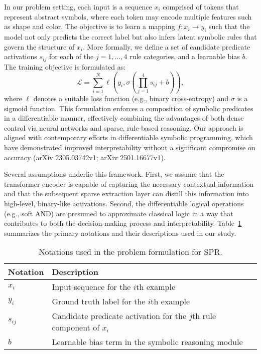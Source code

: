 \documentclass{article}
\begin{document}
In our problem setting, each input is a sequence \( x_i \) comprised of tokens that represent abstract symbols, where each token may encode multiple features such as shape and color. The objective is to learn a mapping \( f: x_i \rightarrow y_i \) such that the model not only predicts the correct label but also infers latent symbolic rules that govern the structure of \( x_i \). More formally, we define a set of candidate predicate activations \( s_{ij} \) for each of the \( j=1,\dots,4 \) rule categories, and a learnable bias \( b \). The training objective is formulated as:
\[
\mathcal{L} = \sum_{i=1}^{N} \ell\left(y_i, \sigma\left(\prod_{j=1}^{4} s_{ij} + b\right)\right),
\]
where \(\ell\) denotes a suitable loss function (e.g., binary cross-entropy) and \(\sigma\) is a sigmoid function. This formulation enforces a composition of symbolic predicates in a differentiable manner, effectively combining the advantages of both dense control via neural networks and sparse, rule-based reasoning. Our approach is aligned with contemporary efforts in differentiable symbolic programming, which have demonstrated improved interpretability without a significant compromise on accuracy (arXiv 2305.03742v1; arXiv 2501.16677v1).

Several assumptions underlie this framework. First, we assume that the transformer encoder is capable of capturing the necessary contextual information and that the subsequent sparse extraction layer can distill this information into high-level, binary-like activations. Second, the differentiable logical operations (e.g., soft AND) are presumed to approximate classical logic in a way that contributes to both the decision-making process and interpretability. Table~\ref{table:notation} summarizes the primary notations and their descriptions used in our study.

\begin{table}[h]
\centering
\begin{tabular}{|l|l|}
\hline
\textbf{Notation} & \textbf{Description} \\ \hline
\( x_i \)    & Input sequence for the \( i \)th example \\ \hline
\( y_i \)    & Ground truth label for the \( i \)th example \\ \hline
\( s_{ij} \) & Candidate predicate activation for the \( j \)th rule component of \( x_i \) \\ \hline
\( b \)      & Learnable bias term in the symbolic reasoning module \\ \hline
\end{tabular}
\caption{Notations used in the problem formulation for SPR.}
\label{table:notation}
\end{table}
\end{document}
